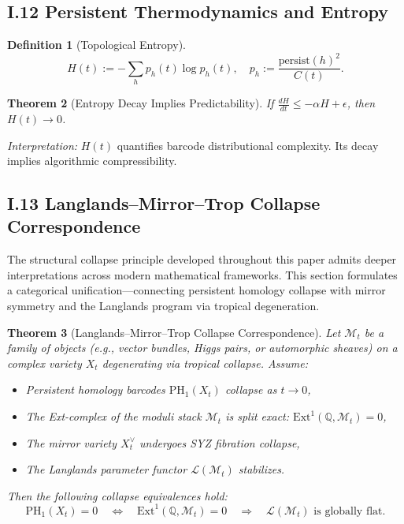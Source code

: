 \documentclass[11pt]{article}
\newtheorem{theorem}{Theorem}[section]
\theoremstyle{definition}
\newtheorem{definition}[theorem]{Definition}
\begin{document}
\subsection*{I.12 Persistent Thermodynamics and Entropy}
\begin{definition}[Topological Entropy]
\[
H(t) := - \sum_h p_h(t) \log p_h(t), \quad p_h := \frac{\mathrm{persist}(h)^2}{C(t)}.
\]
\end{definition}
\begin{theorem}[Entropy Decay Implies Predictability]
If $\frac{dH}{dt} \leq -\alpha H + \epsilon$, then $H(t) \to 0$.
\end{theorem}
\textit{Interpretation:} $H(t)$ quantifies barcode distributional complexity. Its decay implies algorithmic compressibility.

\subsection*{I.13 Langlands–Mirror–Trop Collapse Correspondence}

The structural collapse principle developed throughout this paper admits deeper interpretations across modern mathematical frameworks.  
This section formulates a categorical unification—connecting persistent homology collapse with mirror symmetry and the Langlands program via tropical degeneration.

\begin{theorem}[Langlands–Mirror–Trop Collapse Correspondence]
Let $\mathcal{M}_t$ be a family of objects (e.g., vector bundles, Higgs pairs, or automorphic sheaves) on a complex variety $X_t$ degenerating via tropical collapse.  
Assume:
\begin{itemize}
  \item Persistent homology barcodes $\mathrm{PH}_1(X_t)$ collapse as $t \to 0$,
  \item The Ext-complex of the moduli stack $\mathcal{M}_t$ is split exact: $\mathrm{Ext}^1(\mathbb{Q}, \mathcal{M}_t) = 0$,
  \item The mirror variety $X_t^\vee$ undergoes SYZ fibration collapse,
  \item The Langlands parameter functor $\mathcal{L}(\mathcal{M}_t)$ stabilizes.
\end{itemize}
Then the following collapse equivalences hold:
\[
\mathrm{PH}_1(X_t) = 0 \quad \Longleftrightarrow \quad \mathrm{Ext}^1(\mathbb{Q}, \mathcal{M}_t) = 0 \quad \Longrightarrow \quad \mathcal{L}(\mathcal{M}_t) \text{ is globally flat}.
\]
\end{theorem}
\end{document}
